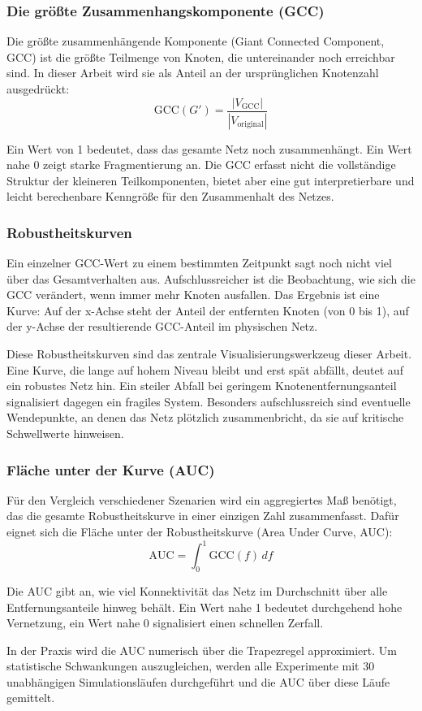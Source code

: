 \subsubsection{Die größte Zusammenhangskomponente (GCC)}

Die größte zusammenhängende Komponente (Giant Connected Component, GCC) ist die größte Teilmenge von Knoten, die untereinander noch erreichbar sind. In dieser Arbeit wird sie als Anteil an der ursprünglichen Knotenzahl ausgedrückt:
\begin{equation}
    \text{GCC}(G') = \frac{|V_{\text{GCC}}|}{|V_{\text{original}}|}
\end{equation}

Ein Wert von 1 bedeutet, dass das gesamte Netz noch zusammenhängt. Ein Wert nahe 0 zeigt starke Fragmentierung an. Die GCC erfasst nicht die vollständige Struktur der kleineren Teilkomponenten, bietet aber eine gut interpretierbare und leicht berechenbare Kenngröße für den Zusammenhalt des Netzes.

\subsubsection{Robustheitskurven}

Ein einzelner GCC-Wert zu einem bestimmten Zeitpunkt sagt noch nicht viel über das Gesamtverhalten aus. Aufschlussreicher ist die Beobachtung, wie sich die GCC verändert, wenn immer mehr Knoten ausfallen. Das Ergebnis ist eine Kurve: Auf der x-Achse steht der Anteil der entfernten Knoten (von 0 bis 1), auf der y-Achse der resultierende GCC-Anteil im physischen Netz.

Diese Robustheitskurven sind das zentrale Visualisierungswerkzeug dieser Arbeit. Eine Kurve, die lange auf hohem Niveau bleibt und erst spät abfällt, deutet auf ein robustes Netz hin. Ein steiler Abfall bei geringem Knotenentfernungsanteil signalisiert dagegen ein fragiles System. Besonders aufschlussreich sind eventuelle Wendepunkte, an denen das Netz plötzlich zusammenbricht, da sie auf kritische Schwellwerte hinweisen.

\subsubsection{Fläche unter der Kurve (AUC)}

Für den Vergleich verschiedener Szenarien wird ein aggregiertes Maß benötigt, das die gesamte Robustheitskurve in einer einzigen Zahl zusammenfasst. Dafür eignet sich die Fläche unter der Robustheitskurve (Area Under Curve, AUC):
\begin{equation}
    \text{AUC} = \int_0^1 \text{GCC}(f) \, df
\end{equation}

Die AUC gibt an, wie viel Konnektivität das Netz im Durchschnitt über alle Entfernungsanteile hinweg behält. Ein Wert nahe 1 bedeutet durchgehend hohe Vernetzung, ein Wert nahe 0 signalisiert einen schnellen Zerfall.

In der Praxis wird die AUC numerisch über die Trapezregel approximiert. Um statistische Schwankungen auszugleichen, werden alle Experimente mit 30 unabhängigen Simulationsläufen durchgeführt und die AUC über diese Läufe gemittelt.
